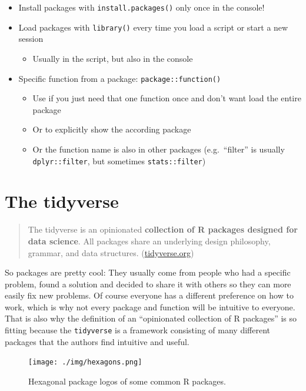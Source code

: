 \documentclass[
]{book}
\providecommand{\tightlist}{%
  \setlength{\itemsep}{0pt}\setlength{\parskip}{0pt}}
\begin{document}
\begin{itemize}
\tightlist
\item
  Install packages with \texttt{install.packages()} only once in the console!
\item
  Load packages with \texttt{library()} every time you load a script or start a new session

  \begin{itemize}
  \tightlist
  \item
    Usually in the script, but also in the console
  \end{itemize}
\item
  Specific function from a package: \texttt{package::function()}

  \begin{itemize}
  \tightlist
  \item
    Use if you just need that one function once and don't want load the entire package
  \item
    Or to explicitly show the according package
  \item
    Or the function name is also in other packages (e.g.~``filter'' is usually \texttt{dplyr::filter}, but sometimes \texttt{stats::filter})
  \end{itemize}
\end{itemize}

\section{The tidyverse}\label{the-tidyverse}

\begin{quote}
The tidyverse is an opinionated \textbf{collection of R packages designed for data science}. All packages share an underlying design philosophy, grammar, and data structures. (\url{tidyverse.org})
\end{quote}

So packages are pretty cool: They usually come from people who had a specific problem, found a solution and decided to share it with others so they can more easily fix new problems.
Of course everyone has a different preference on how to work, which is why not every package and function will be intuitive to everyone.
That is also why the definition of an ``opinionated collection of R packages'' is so fitting because the \texttt{tidyverse} is a framework consisting of many different packages that the authors find intuitive and useful.

\begin{figure}
\centering
\texttt{[image: ./img/hexagons.png]}
\caption{\label{fig:hexagon2}Hexagonal package logos of some common R packages.}
\end{figure}
\end{document}
